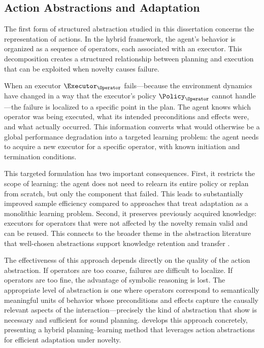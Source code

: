 \subsection{Action Abstractions and Adaptation}
\label{sec:action_abstractions}

The first form of structured abstraction studied in this dissertation concerns the representation of actions. In the hybrid framework, the agent's behavior is organized as a sequence of operators, each associated with an executor. This decomposition creates a structured relationship between planning and execution that can be exploited when novelty causes failure.

When an executor $\Executor_\Operator$ fails---because the environment dynamics have changed in a way that the executor's policy $\Policy_\Operator$ cannot handle---the failure is localized to a specific point in the plan. The agent knows which operator was being executed, what its intended preconditions and effects were, and what actually occurred. This information converts what would otherwise be a global performance degradation into a targeted learning problem: the agent needs to acquire a new executor for a specific operator, with known initiation and termination conditions.

This targeted formulation has two important consequences. First, it restricts the scope of learning: the agent does not need to relearn its entire policy or replan from scratch, but only the component that failed. This leads to substantially improved sample efficiency compared to approaches that treat adaptation as a monolithic learning problem. Second, it preserves previously acquired knowledge: executors for operators that were not affected by the novelty remain valid and can be reused. This connects to the broader theme in the abstraction literature that well-chosen abstractions support knowledge retention and transfer \citep{abel2018state, konidaris2007building}.

The effectiveness of this approach depends directly on the quality of the action abstraction. If operators are too coarse, failures are difficult to localize. If operators are too fine, the advantage of symbolic reasoning is lost. The appropriate level of abstraction is one where operators correspond to semantically meaningful units of behavior whose preconditions and effects capture the causally relevant aspects of the interaction---precisely the kind of abstraction that \citet{konidaris2018skills} show is necessary and sufficient for sound planning.  develops this approach concretely, presenting a hybrid planning--learning method that leverages action abstractions for efficient adaptation under novelty.

